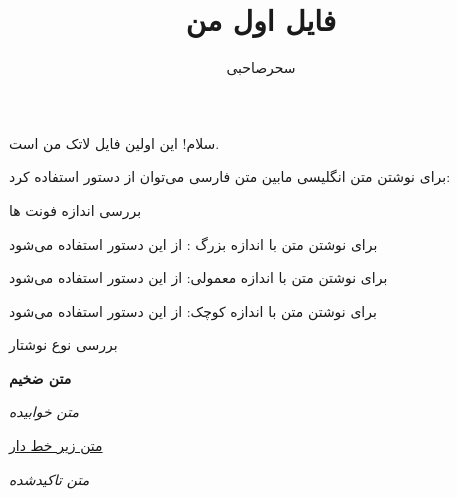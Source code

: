 \documentclass[12pt]{article}
\title{فایل اول من}
\author{سحرصاحبی}
\begin{document}
	\maketitle
	
	
	
	سلام! این اولین فایل لاتک من است.
	
	
	برای نوشتن متن انگلیسی مابین متن فارسی می‌توان از دستور
	استفاده کرد: 
	
	
	
	
	\lr{-----------------------------------------------------------------------------}
	
	\large{بررسی اندازه فونت ها}
	
	برای نوشتن متن با اندازه بزرگ : 
	{\LARGE از این دستور استفاده می‌شود }
	
	برای نوشتن متن با اندازه معمولی:
	{\normalsize از این دستور استفاده می‌شود}
	
	برای نوشتن متن با اندازه کوچک:
	{\tiny از این دستور استفاده می‌شود}
	
	
	\lr{-----------------------------------------------------------------------------}	
	
	بررسی نوع نوشتار
	
	\textbf{متن ضخیم}
	
	\textit{متن خوابیده}
	
	\underline{متن زیر خط دار}
	
	
	\emph{متن تاکیدشده}
	
	
	
\end{document}
